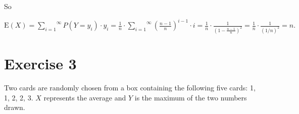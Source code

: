 \documentclass[12pt,thmsa]{article}
\begin{document}
\begin{enumerate}
\begin{enumerate}
So
\begin{center}
$\mbox{E}(X) = \overset{\infty}{\underset{i=1}{\sum}}P(Y=y_i)\cdot y_i = \frac{1}{n}\cdot \overset{\infty}{\underset{i=1}{\sum}}(\frac{n-1}{n})^{i-1}\cdot i=\frac{1}{n}\cdot \frac{1}{(1-\frac{n-1}{n})^2}=\frac{1}{n}\cdot \frac{1}{(1/n)^2}=n.$
\end{center}

\end{enumerate}
\end{enumerate}


\section*{Exercise 3} %

Two cards are randomly chosen from a box containing the following five cards: 1, 1, 2, 2, 3. $X$ represents the average and $Y$ is the maximum of the two numbers drawn.
\end{document}
